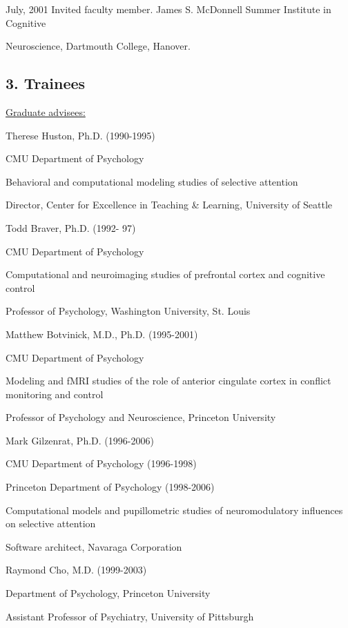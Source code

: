 \documentclass[10 pt]{article}
\begin{document}
July, 2001 \hspace{0.44in} Invited faculty member. James S. McDonnell Summer Institute in Cognitive

\hspace{1.1in} Neuroscience, Dartmouth College, Hanover.
    \smallskip

\subsection*{3. Trainees} \label{secTEACHING3}
    \smallskip

{\fontsize{12pt}{16 pt}\selectfont \underline{Graduate advisees:}}
    \smallskip

Therese Huston, Ph.D. (1990-1995)

CMU Department of Psychology

Behavioral and computational modeling studies of selective attention

Director, Center for Excellence in Teaching \& Learning, University of Seattle
    \medskip

Todd Braver, Ph.D. (1992- 97)

CMU Department of Psychology

Computational and neuroimaging studies of prefrontal cortex and cognitive control

Professor of Psychology, Washington University, St. Louis
    \medskip

Matthew Botvinick, M.D., Ph.D. (1995-2001)

CMU Department of Psychology

Modeling and fMRI studies of the role of anterior cingulate cortex in conflict monitoring and control

Professor of Psychology and Neuroscience, Princeton University
    \medskip

Mark Gilzenrat, Ph.D. (1996-2006)

CMU Department of Psychology (1996-1998)

Princeton Department of Psychology (1998-2006)

Computational models and pupillometric studies of neuromodulatory influences on selective attention

Software architect, Navaraga Corporation
    \medskip

Raymond Cho, M.D. (1999-2003)

Department of Psychology, Princeton University

Assistant Professor of Psychiatry, University of Pittsburgh
    \medskip
\end{document}
